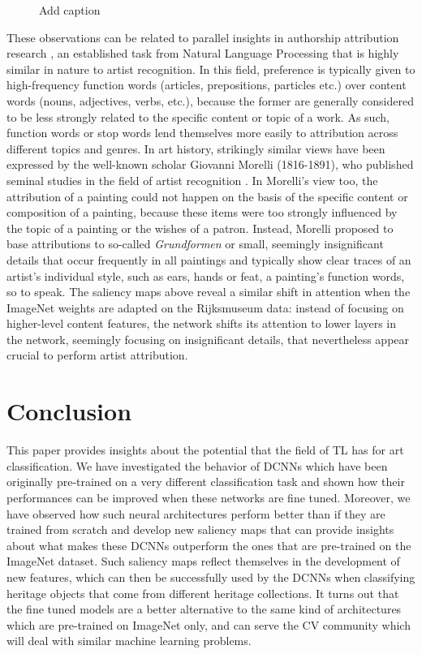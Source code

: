 \begin{figure}[!htb]
\endminipage

\caption{Add caption}
\label{fig:saliency_maps}
\end{figure}


These observations can be related to parallel insights in authorship attribution research \cite{stamatatos:2009}, an established task from Natural Language Processing that is highly similar in nature to artist recognition. In this field, preference is typically given to high-frequency function words (articles, prepositions, particles etc.) over content words (nouns, adjectives, verbs, etc.), because the former are generally considered to be less strongly related to the specific content or topic of a work. As such, function words or stop words lend themselves more easily to attribution across different topics and genres. In art history, strikingly similar views have been expressed by the well-known scholar Giovanni Morelli (1816-1891), who published seminal studies in the field of artist recognition \cite{wollheim:1972}. In Morelli's view too, the attribution of a painting could not happen on the basis of the specific content or composition of a painting, because these items were too strongly influenced by the topic of a painting or the wishes of a patron. Instead, Morelli proposed to base attributions to so-called \emph{Grundformen} or small, seemingly insignificant details that occur frequently in all paintings and typically show clear traces of an artist's individual style, such as ears, hands or feat, a painting's function words, so to speak. The saliency maps above reveal a similar shift in attention when the ImageNet weights are adapted on the Rijksmuseum data: instead of focusing on higher-level content features, the network shifts its attention to lower layers in the network, seemingly focusing on insignificant details, that nevertheless appear crucial to perform artist attribution.


\section{Conclusion} 
\label{sec:conclusion}
 
This paper provides insights about the potential that the field of TL has for art classification. We have investigated the behavior of DCNNs which have been originally pre-trained on a very different classification task and shown how their performances can be improved when these networks are fine tuned. Moreover, we have observed how such neural architectures perform better than if they are trained from scratch and develop new saliency maps that can provide insights about what makes these DCNNs outperform the ones that are pre-trained on the ImageNet dataset. Such saliency maps reflect themselves in the development of new features, which can then be successfully used by the DCNNs when classifying heritage objects that come from different heritage collections. It turns out that the fine tuned models are a better alternative to the same kind of architectures which are pre-trained on ImageNet only, and can serve the CV community which will deal with similar machine learning problems.

